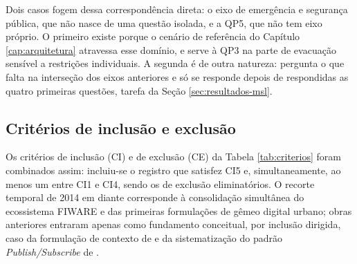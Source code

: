Dois casos fogem dessa correspondência direta: o eixo de emergência e segurança pública, que não nasce de uma questão isolada, e a QP5, que não tem eixo próprio. O primeiro existe porque o cenário de referência do Capítulo \ref{cap:arquitetura} atravessa esse domínio, e serve à QP3 na parte de evacuação sensível a restrições individuais. A segunda é de outra natureza: pergunta o que falta na interseção dos eixos anteriores e só se responde depois de respondidas as quatro primeiras questões, tarefa da Seção \ref{sec:resultados-msl}.

\subsection{Critérios de inclusão e exclusão}
\label{sec:criterios}

Os critérios de inclusão (CI) e de exclusão (CE) da Tabela \ref{tab:criterios} foram combinados assim: incluiu-se o registro que satisfez CI5 e, simultaneamente, ao menos um entre CI1 e CI4, sendo os de exclusão eliminatórios. O recorte temporal de 2014 em diante corresponde à consolidação simultânea do ecossistema FIWARE e das primeiras formulações de gêmeo digital urbano; obras anteriores entraram apenas como fundamento conceitual, por inclusão dirigida, caso da formulação de contexto de  e da sistematização do padrão \textit{Publish/Subscribe} de .

